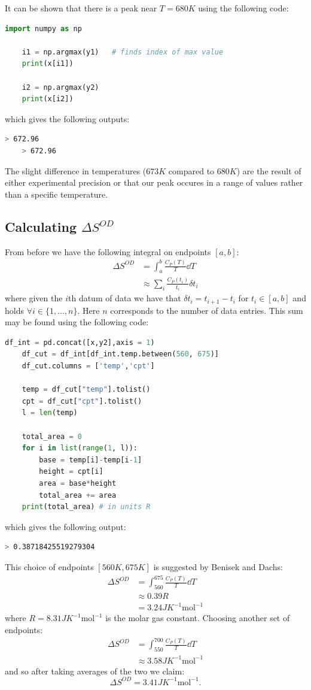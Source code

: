 \documentclass{article}
\begin{document}
It can be shown that there is a peak
near $T=680K$ using the following code:
\begin{lstlisting}[language=Python]
    import numpy as np

    i1 = np.argmax(y1)   # finds index of max value
    print(x[i1])

    i2 = np.argmax(y2)
    print(x[i2])
\end{lstlisting}
which gives the following outputs:
\begin{lstlisting}[language=bash]
    > 672.96
    > 672.96
\end{lstlisting}
The slight difference in temperatures ($673K$ compared to $680K$) are the result of
either experimental precision or that our peak occures
in a range of values rather than a specific temperature.

\newpage

\subsection{Calculating $\Delta S^{OD}$}
From before we have the following integral on endpoints $[a,b]$:
\begin{align*}
    \Delta S^{OD}
    &=\int_{a}^{b}\frac{C_P(T)}{T}\dd T \\
    &\approx\sum_i\frac{C_P(t_i)}{t_i}\delta t_i
\end{align*}
where given the $i$th datum of data 
we have that $\delta t_i=t_{i+1}-t_i$
for $t_i\in[a,b]$
and holds $\forall i\in\{1,\dots,n\}$.
Here $n$ corresponds to the number of data entries.
This sum may be found using the following code:
\begin{lstlisting}[language=Python]
    df_int = pd.concat([x,y2],axis = 1)
    df_cut = df_int[df_int.temp.between(560, 675)]
    df_cut.columns = ['temp','cpt']

    temp = df_cut["temp"].tolist()
    cpt = df_cut["cpt"].tolist()
    l = len(temp)

    total_area = 0
    for i in list(range(1, l)):
        base = temp[i]-temp[i-1]
        height = cpt[i]
        area = base*height
        total_area += area
    print(total_area) # in units R
\end{lstlisting}
which gives the following output:
\begin{lstlisting}[language=bash]
    > 0.38718425519279304
\end{lstlisting}
This choice of endpoints $[560K,675K]$ is suggested by
Benisek and Dachs:
\begin{align*}
    \Delta S^{OD}
    &=\int_{560}^{675}\frac{C_P(T)}{T}\dd T \\
    &\approx 0.39R \\
    &=3.24JK^{-1}\text{mol}^{-1}
\end{align*}
where $R=8.31JK^{-1}\text{mol}^{-1}$ is the molar gas constant.
Choosing another set of endpoints:
\begin{align*}
    \Delta S^{OD}
    &=\int_{550}^{700}\frac{C_P(T)}{T}\dd T \\
    &\approx3.58JK^{-1}\text{mol}^{-1}
\end{align*}
and so after taking averages of the two we claim:
$$\Delta S^{OD}=3.41JK^{-1}\text{mol}^{-1}.$$
\end{document}
